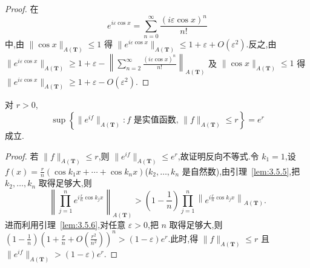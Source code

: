 \begin{proof}
在
\begin{equation*}
e^{i\varepsilon\cos x} = \sum_{n=0}^{\infty}\frac{(i\varepsilon\cos x)^{n}}{n!}
\end{equation*}
中,由 $\|\cos x\|_{A(\mathbf{T})} \leq 1$ 得 $\|e^{i\varepsilon\cos x}\|_{A(\mathbf{T})} \leq 1 + \varepsilon + O(\varepsilon^{2})$.反之,由 $\|e^{i\varepsilon\cos x}\|_{A(\mathbf{T})} \geq 1 + \varepsilon - \left\|\sum_{n=2}^{\infty}\frac{(i\varepsilon\cos x)^{n}}{n!}\right\|_{A(\mathbf{T})}$ 及 $\|\cos x\|_{A(\mathbf{T})} \leq 1$ 得 $\|e^{i\varepsilon\cos x}\|_{A(\mathbf{T})} \geq 1 + \varepsilon - O(\varepsilon^{2})$.
\end{proof}

\begin{lemma}\label{lem:3.5.7}
对 $r > 0$,
\begin{equation*}
\sup\left\{\|e^{if}\|_{A(\mathbf{T})}: f \text{ 是实值函数, } \|f\|_{A(\mathbf{T})} \leq r\right\} = e^{r}
\end{equation*}
成立.
\end{lemma}

\begin{proof}
若 $\|f\|_{A(\mathbf{T})} \leq r$,则 $\|e^{if}\|_{A(\mathbf{T})} \leq e^{r}$,故证明反向不等式.令 $k_{1} = 1$,设 $f(x) = \frac{r}{n}(\cos k_{1}x + \cdots + \cos k_{n}x)$($k_{2}, \ldots, k_{n}$ 是自然数),由引理~\ref{lem:3.5.5},把 $k_{2}, \ldots, k_{n}$ 取得足够大,则
\begin{equation*}
\left\|\prod_{j=1}^{n}e^{i\frac{r}{n}\cos k_{j}x}\right\|_{A(\mathbf{T})} > \left(1 - \frac{1}{n}\right)\prod_{j=1}^{n}\left\|e^{i\frac{r}{n}\cos k_{j}x}\right\|_{A(\mathbf{T})}.
\end{equation*}
进而利用引理~\ref{lem:3.5.6},对任意 $\varepsilon > 0$,把 $n$ 取得足够大,则 $\left(1 - \frac{1}{n}\right)\left(1 + \frac{r}{n} + O\left(\frac{r^{2}}{n^{2}}\right)\right)^{n} > (1 - \varepsilon)e^{r}$.此时,得 $\|f\|_{A(\mathbf{T})} \leq r$ 且 $\|e^{if}\|_{A(\mathbf{T})} > (1 - \varepsilon)e^{r}$.
\end{proof}

